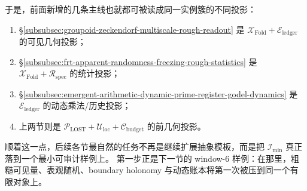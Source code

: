 于是，前面新增的几条主线也就都可被读成同一实例簇的不同投影：
\begin{enumerate}
  \item \S\ref{subsubsec:groupoid-zeckendorf-multiscale-rough-readout} 是 \(\mathcal X_{\mathrm{Fold}}+\mathcal E_{\mathrm{ledger}}\) 的可见几何投影；
  \item \S\ref{subsubsec:frt-apparent-randomness-freezing-rough-statistics} 是 \(\mathcal X_{\mathrm{Fold}}+\mathcal R_{\mathrm{spec}}\) 的统计投影；
  \item \S\ref{subsubsec:emergent-arithmetic-dynamic-prime-register-godel-dynamics} 是 \(\mathcal E_{\mathrm{ledger}}\) 的动态乘法/历史投影；
  \item 上两节则是 \(\mathcal P_{\mathrm{LOST}}+\mathcal U_{\mathrm{loc}}+\mathcal C_{\mathrm{budget}}\) 的前几何投影。
\end{enumerate}
顺着这一点，后续各节最自然的任务不再是继续扩展抽象模板，而是把 \(\mathcal I_{\min}\) 真正落到一个最小可审计样例上。
第一步正是下一节的 window-\(6\) 样例：在那里，粗糙可见量、表观随机、boundary holonomy 与动态账本将第一次被压到同一个有限对象上。

